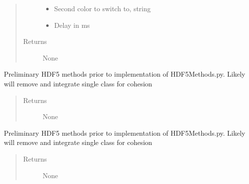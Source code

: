 \documentclass[letterpaper,10pt,english]{sphinxmanual}
\begin{document}
\begin{fulllineitems}
\begin{fulllineitems}
\begin{quote}
\begin{description}
\begin{itemize}
\item {} 
\sphinxAtStartPar
{} \textendash{} Second color to switch to, string

\item {} 
\sphinxAtStartPar
{} \textendash{} Delay in ms

\end{itemize}

\item[{Returns}] \leavevmode
\sphinxAtStartPar
None

\end{description}\end{quote}

\end{fulllineitems}


\begin{fulllineitems}
\label{\detokenize{index:droogCNC.TwoAxisStage.__createDataFile}}
\sphinxAtStartPar
Preliminary HDF5 methods prior to implementation of HDF5Methods.py. Likely will remove and integrate single class
for cohesion
\begin{quote}\begin{description}
\item[{Returns}] \leavevmode
\sphinxAtStartPar
None

\end{description}\end{quote}

\end{fulllineitems}


\begin{fulllineitems}
\label{\detokenize{index:droogCNC.TwoAxisStage.__createDataSet}}
\sphinxAtStartPar
Preliminary HDF5 methods prior to implementation of HDF5Methods.py. Likely will remove and integrate single
class for cohesion
\begin{quote}\begin{description}
\item[{Returns}] \leavevmode
\sphinxAtStartPar
None


\end{description}
\end{quote}
\end{fulllineitems}
\end{fulllineitems}
\end{document}
